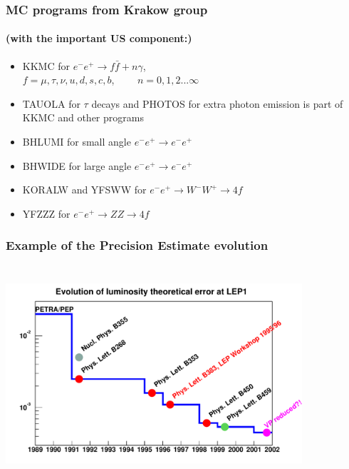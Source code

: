 \documentclass{beamer}
\begin{document}
\begin{frame}[fragile]
\frametitle{\bf MC programs from Krakow group}
\framesubtitle{\bf (with the important US component:)}

\begin{itemize}
\item
KKMC for $e^-e^+ \to f\bar{f}+ n\gamma$,\\
$f=\mu,\tau,\nu,u,d,s,c,b$,~~~~ $n=0,1,2...\infty$
\item
TAUOLA for $\tau$ decays and PHOTOS for extra photon emission
is part of KKMC and other programs
\item
BHLUMI for small angle $e^-e^+ \to e^-e^+$
\item
BHWIDE for large angle $e^-e^+ \to e^-e^+$
\item
KORALW and YFSWW for $e^-e^+ \to W^-W^+ \to 4f $
\item
YFZZZ for $e^-e^+ \to ZZ \to 4f $
\end{itemize}

\end{frame}

\begin{frame}[fragile]
\frametitle{\bf Example of the Precision Estimate evolution }

\vspace{-2mm}
{\includegraphics[width=110mm,height=80mm]{cFigA.pdf}}

\end{frame}
\end{document}
